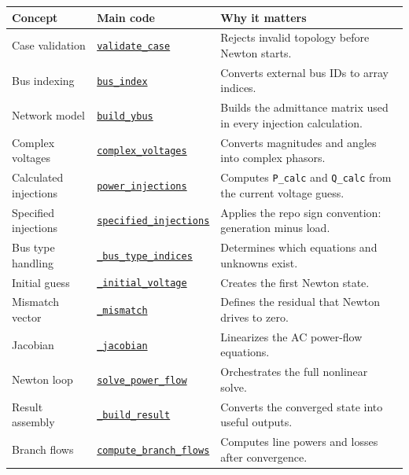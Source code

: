 \documentclass[11pt]{article}
\newcommand{\code}[1]{\texttt{#1}}
\begin{document}
\renewcommand{\arraystretch}{1.18}
\begin{longtable}{p{}p{}p{}}
\toprule
Concept & Main code & Why it matters \\
\midrule
\endhead
Case validation &
\href{../src/powerflow/case.py\#L63}{\code{validate\_case}} &
Rejects invalid topology before Newton starts. \\
Bus indexing &
\href{../src/powerflow/case.py\#L58}{\code{bus\_index}} &
Converts external bus IDs to array indices. \\
Network model &
\href{../src/powerflow/ybus.py\#L10}{\code{build\_ybus}} &
Builds the admittance matrix used in every injection calculation. \\
Complex voltages &
\href{../src/powerflow/flows.py\#L35}{\code{complex\_voltages}} &
Converts magnitudes and angles into complex phasors. \\
Calculated injections &
\href{../src/powerflow/solver.py\#L36}{\code{power\_injections}} &
Computes \code{P\_calc} and \code{Q\_calc} from the current voltage guess. \\
Specified injections &
\href{../src/powerflow/solver.py\#L30}{\code{specified\_injections}} &
Applies the repo sign convention: generation minus load. \\
Bus type handling &
\href{../src/powerflow/solver.py\#L46}{\code{\_bus\_type\_indices}} &
Determines which equations and unknowns exist. \\
Initial guess &
\href{../src/powerflow/solver.py\#L53}{\code{\_initial\_voltage}} &
Creates the first Newton state. \\
Mismatch vector &
\href{../src/powerflow/solver.py\#L62}{\code{\_mismatch}} &
Defines the residual that Newton drives to zero. \\
Jacobian &
\href{../src/powerflow/solver.py\#L77}{\code{\_jacobian}} &
Linearizes the AC power-flow equations. \\
Newton loop &
\href{../src/powerflow/solver.py\#L139}{\code{solve\_power\_flow}} &
Orchestrates the full nonlinear solve. \\
Result assembly &
\href{../src/powerflow/solver.py\#L195}{\code{\_build\_result}} &
Converts the converged state into useful outputs. \\
Branch flows &
\href{../src/powerflow/flows.py\#L39}{\code{compute\_branch\_flows}} &
Computes line powers and losses after convergence. \\
\bottomrule
\end{longtable}
\end{document}
